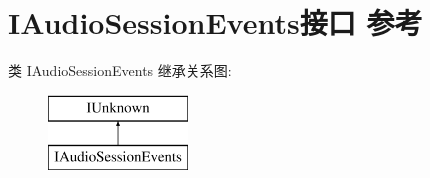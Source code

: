 \hypertarget{interface_i_audio_session_events}{}\section{I\+Audio\+Session\+Events接口 参考}
\label{interface_i_audio_session_events}
类 I\+Audio\+Session\+Events 继承关系图\+:\begin{figure}[H]
\begin{center}
\leavevmode
\includegraphics[height=2.000000cm]{interface_i_audio_session_events}
\end{center}
\end{figure}
